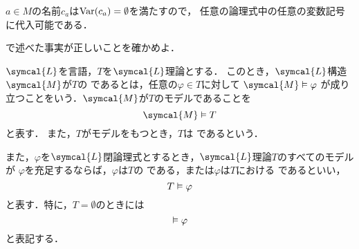 \begin{Note}
	\(a \in M\)の名前\(c_a\)は\(\apply{\Var}{c_a} = \emptyset\)を満たすので，
	任意の論理式中の任意の変数記号に代入可能である．
\end{Note}


\begin{Que} \label{Que:satisfy}
	で述べた事実が正しいことを確かめよ．
\end{Que}

\begin{Def} \label{Def:model}
	\(\symcal{L}\)を言語，\(T\)を\(\symcal{L}\)理論とする．
	このとき，\(\symcal{L}\)構造\(\symcal{M}\)が\(T\)の%
	であるとは，任意の\(\varphi \in T\)に対して
	\(\symcal{M} \satisfy \varphi\)
	が成り立つことをいう．\(\symcal{M}\)が\(T\)のモデルであることを%
	\begin{equation}
		\symcal{M} \satisfy T
		\label{eq:model}
	\end{equation}
	と表す．
	また，\(T\)がモデルをもつとき，\(T\)は%
	であるという．

	また，\(\varphi\)を\(\symcal{L}\)閉論理式とするとき，\(\symcal{L}\)理論\(T\)のすべてのモデルが
	\(\varphi\)を充足するならば，\(\varphi\)は\(T\)の%
	である，または\(\varphi\)は\(T\)における%
	であるといい，
	\begin{equation}
		T \vDash \varphi
		\label{eq:logicalconsequence}
	\end{equation}
	と表す．特に，\(T = \emptyset\)のときには
	\begin{equation}
		\vDash \varphi
		\label{eq:nulllogicalconsequence}
	\end{equation}
	と表記する．
\end{Def}

